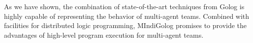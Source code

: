 \documentclass{llncs}
\begin{document}
As we have shown, the combination of state-of-the-art
techniques from Golog is highly capable of representing the behavior
of multi-agent teams. Combined with facilities for distributed logic
programming, MIndiGolog promises to provide the advantages of high-level
program execution for multi-agent teams.



\end{document}
